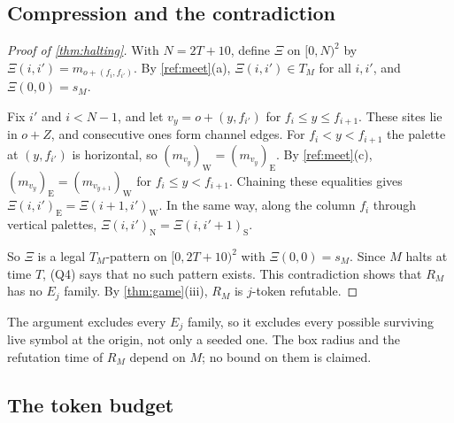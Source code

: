 \subsection{Compression and the contradiction}\label{ref:sec-compress}

\begin{proof}[Proof of \cref{thm:halting}]
With $N=2T+10$, define $\Xi$ on $[0,N)^2$ by $\Xi(i,i')=m_{o+(f_i,f_{i'})}$. By \cref{ref:meet}(a), $\Xi(i,i')\in T_M$ for all $i,i'$, and $\Xi(0,0)=s_M$.

Fix $i'$ and $i<N-1$, and let $v_y=o+(y,f_{i'})$ for $f_i\le y\le f_{i+1}$. These sites lie in $o+Z$, and consecutive ones form channel edges. For $f_i<y<f_{i+1}$ the palette at $(y,f_{i'})$ is horizontal, so $(m_{v_y})_{\mathrm W}=(m_{v_y})_{\mathrm E}$. By \cref{ref:meet}(c), $(m_{v_y})_{\mathrm E}=(m_{v_{y+1}})_{\mathrm W}$ for $f_i\le y<f_{i+1}$. Chaining these equalities gives $\Xi(i,i')_{\mathrm E}=\Xi(i+1,i')_{\mathrm W}$. In the same way, along the column $f_i$ through vertical palettes, $\Xi(i,i')_{\mathrm N}=\Xi(i,i'+1)_{\mathrm S}$.

So $\Xi$ is a legal $T_M$-pattern on $[0,2T+10)^2$ with $\Xi(0,0)=s_M$. Since $M$ halts at time $T$, (Q4) says that no such pattern exists. This contradiction shows that $R_M$ has no $E_j$ family. By \cref{thm:game}(iii), $R_M$ is $j$-token refutable.
\end{proof}

The argument excludes every $E_j$ family, so it excludes every possible surviving live symbol at the origin, not only a seeded one. The box radius and the refutation time of $R_M$ depend on $M$; no bound on them is claimed.

\subsection{The token budget}\label{ref:sec-budget}

